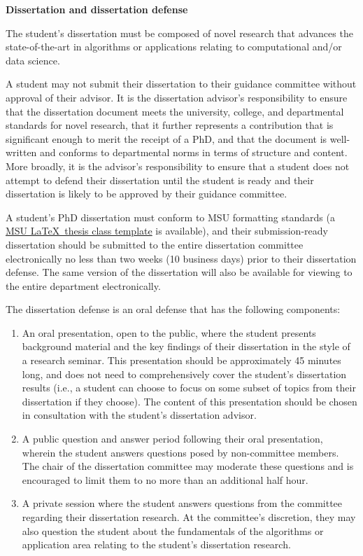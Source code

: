 \vspace{3mm}
\noindent
\textbf{Dissertation and dissertation defense}

The student's dissertation must be composed of novel research that
advances the state-of-the-art in algorithms or applications relating
to computational and/or data science.

A student may not submit their dissertation to their guidance
committee without approval of their advisor.  It is the dissertation
advisor's responsibility to ensure that the dissertation document
meets the university, college, and departmental standards for novel
research, that it further represents a contribution that is
significant enough to merit the receipt of a PhD, and that the
document is well-written and  conforms to departmental norms in
terms of structure and content.  More broadly, it is the advisor's
responsibility to ensure that a student does not attempt to defend
their dissertation until the student is ready and  their dissertation
is likely to be approved by their guidance committee.

A student's PhD dissertation must conform to MSU formatting standards
(a \href{http://ctan.org/pkg/msu-thesis}{MSU \LaTeX\ thesis class
  template} is available), and their submission-ready dissertation should be submitted to the entire
dissertation committee electronically no less than two weeks (10 business days) prior to
their dissertation defense.  The same version of the dissertation will also be available for
viewing to the entire department electronically.

The dissertation defense is an oral defense that has the following
components:

\begin{enumerate}

\item An oral presentation, open to the public, where the student
  presents background material and the key findings of their
  dissertation in the style of a research seminar.  This presentation
  should be approximately 45 minutes long, and does not need to
  comprehensively cover the student's dissertation results (i.e., a
  student can choose to focus on some subset of topics from their
  dissertation if they choose).  The content of this presentation
  should be chosen in consultation with the student's dissertation advisor.

\item A public question and answer period following their oral
  presentation, wherein the student answers questions posed by
  non-committee members.  The chair of the dissertation committee may
  moderate these questions and is encouraged to limit them to no more
  than an additional half hour.

\item A private session where the student answers questions from the
  committee regarding their dissertation research.  At the committee's
  discretion, they may also question the student about the
  fundamentals of the algorithms or application area relating to the
  student's dissertation research.

\end{enumerate}

